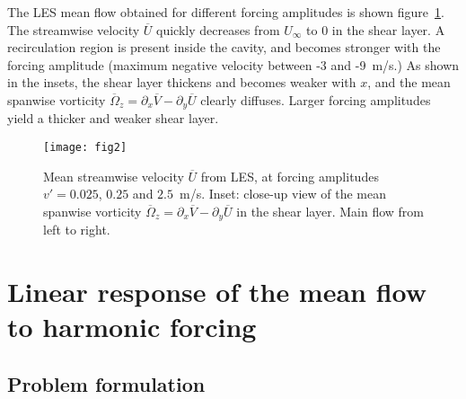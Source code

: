 \documentclass[11pt,onecolumn]{article}
\def\Um{\overline{U}}
\def\Vm{\overline{V}}
\def\meanvort{\overline{\Omega}}
\def\Ubulk  {        U_\infty }
\begin{document}
The LES mean flow obtained for different forcing amplitudes is shown figure~\ref{fig:vort}.
The streamwise velocity $\Um$ quickly decreases from $\Ubulk$ to 0 in the shear layer. A recirculation region is present inside the cavity, and becomes stronger with the forcing amplitude (maximum negative velocity between -3 and -9~m/s.)
As shown in the insets, the shear layer thickens and becomes weaker with $x$, and the mean spanwise vorticity $\meanvort_z = \partial_x \Vm - \partial_y \Um$ clearly diffuses.
Larger forcing amplitudes yield a thicker and weaker shear layer.


\begin{figure}[] %
\centerline{
\texttt{[image: fig2]}
}
\vspace{-0.2cm}
\caption{
Mean streamwise velocity $\Um$ from LES, at forcing amplitudes $v'=0.025$, $0.25$ and $2.5$~m/s.
Inset: close-up view of the mean spanwise vorticity $\meanvort_z = \partial_x \Vm - \partial_y \Um$ in the shear layer.
Main flow from left to right.
} 
\label{fig:vort}
\end{figure}


\section{Linear response of the mean flow to harmonic forcing}
\label{sec:LinResp}

\subsection{Problem formulation}
\label{sec:Problem}
\end{document}
